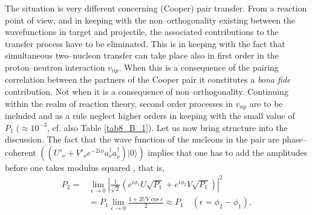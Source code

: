 The situation is very different concerning (Cooper) pair transfer. From a reaction point of view, and in keeping with the non--orthogonality existing between the wavefunctions in target and projectile, the associated contributions to the transfer process have to be eliminated. This is in keeping with the fact that simultaneous two--nucleon transfer can take place also in first order in the proton--neutron interaction     $v_{np}$. When this is a consequence of the pairing correlation between the partners of the Cooper pair  it constitutes a \emph{bona fide} contribution. Not when it is a consequence of non--orthogonality. Continuing within the realm of reaction theory, second order processes in $v_{np}$ are to be included  and as a rule neglect higher orders in keeping with the small value of $P_1 \;(\approx10^{-3}$, cf. also Table \ref{tab8_B_1}). Let us now bring structure into the discussion. The fact that the wave function of the nucleons in the pair are phase--coherent $(\left(U'_\nu+V'_\nu e^{-2i\phi}a_\nu^\dagger a_{\bar\nu}^\dagger\right)|0\rangle)$ implies that one has to add the amplitudes before one takes modulus squared , that is,
\begin{align}\label{eq3.2.19}
\nonumber P_2=&\lim_{\epsilon\rightarrow 0}\left|\frac{1}{\sqrt{2}}\left(e^{i\phi_1}U\sqrt{P_1}+e^{i\phi_2}V\sqrt{P_1}\right)\right|^2\\
&=P_1 \lim_{\epsilon\rightarrow 0} \frac{1+2UV\cos\epsilon}{2}\approx P_1\quad (\epsilon=\phi_2-\phi_1),
\end{align}
